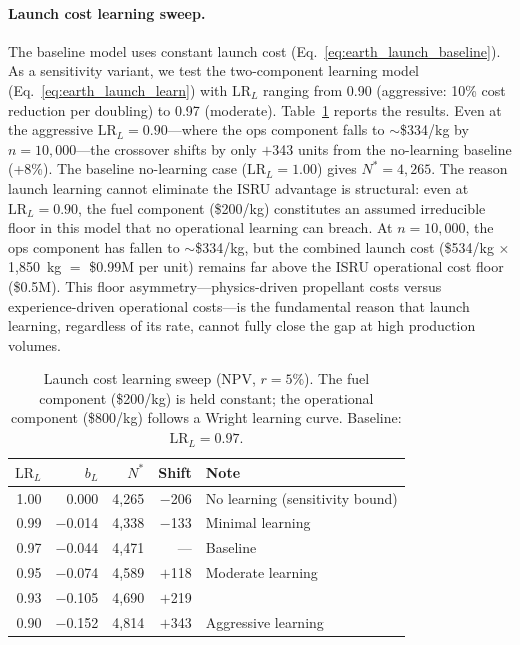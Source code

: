 \documentclass[preprint,12pt]{elsarticle}
\begin{document}
\paragraph{Launch cost learning sweep.} The baseline model uses constant launch cost (Eq.~\ref{eq:earth_launch_baseline}). As a sensitivity variant, we test the two-component learning model (Eq.~\ref{eq:earth_launch_learn}) with $\mathrm{LR}_L$ ranging from 0.90 (aggressive: 10\% cost reduction per doubling) to 0.97 (moderate). Table~\ref{tab:launch_learning} reports the results. Even at the aggressive $\mathrm{LR}_L = 0.90$---where the ops component falls to $\sim$\$334/kg by $n = 10{,}000$---the crossover shifts by only $+$343 units from the no-learning baseline (+8\%). The baseline no-learning case ($\mathrm{LR}_L = 1.00$) gives $N^* = 4{,}265$. The reason launch learning cannot eliminate the ISRU advantage is structural: even at $\mathrm{LR}_L = 0.90$, the fuel component (\$200/kg) constitutes an assumed irreducible floor in this model that no operational learning can breach. At $n = 10{,}000$, the ops component has fallen to $\sim$\$334/kg, but the combined launch cost (\$534/kg $\times$ 1{,}850~kg $=$ \$0.99M per unit) remains far above the ISRU operational cost floor (\$0.5M). This floor asymmetry---physics-driven propellant costs versus experience-driven operational costs---is the fundamental reason that launch learning, regardless of its rate, cannot fully close the gap at high production volumes.

\begin{table}[htbp]
\centering
\caption{Launch cost learning sweep (NPV, $r = 5\%$). The fuel component (\$200/kg) is held constant; the operational component (\$800/kg) follows a Wright learning curve. Baseline: $\mathrm{LR}_L = 0.97$.}
\label{tab:launch_learning}
\small
\begin{tabular}{@{}rrrrl@{}}
\toprule
$\mathrm{LR}_L$ & $b_L$ & $N^*$ & Shift & Note \\
\midrule
1.00 & 0.000  & 4{,}265 & $-$206 & No learning (sensitivity bound) \\
0.99 & $-$0.014 & 4{,}338 & $-$133 & Minimal learning \\
0.97 & $-$0.044 & 4{,}471 & ---    & Baseline \\
0.95 & $-$0.074 & 4{,}589 & $+$118 & Moderate learning \\
0.93 & $-$0.105 & 4{,}690 & $+$219 & \\
0.90 & $-$0.152 & 4{,}814 & $+$343 & Aggressive learning \\
\bottomrule
\end{tabular}
\end{table}
\end{document}
